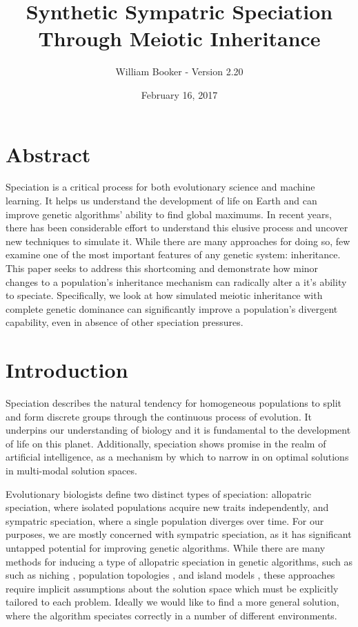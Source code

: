 \documentclass{article}
\title{Synthetic Sympatric Speciation Through Meiotic Inheritance}
\author{William Booker - Version 2.20}
\date{February 16, 2017}
\newcommand\TODO[1]{\textcolor{red}{#1}}
\begin{document}
\captionsetup{justification=centering}

\maketitle


\section{Abstract}

Speciation is a critical process for both evolutionary science and machine learning. It helps us understand the development of life on Earth and can improve genetic algorithms' ability to find global maximums. In recent years, there has been considerable effort to understand this elusive process and uncover new techniques to simulate it. While there are many approaches for doing so, few examine one of the most important features of any genetic system: inheritance. This paper seeks to address this shortcoming and demonstrate how minor changes to a population's inheritance mechanism can radically alter a it's ability to speciate. Specifically, we look at how simulated meiotic inheritance with complete genetic dominance can significantly improve a population's divergent capability, even in absence of other speciation pressures. 



\section{Introduction}

Speciation describes the natural tendency for homogeneous populations to split and form discrete groups through the continuous process of evolution. \cite{SPBOOK} It underpins our understanding of biology and it is fundamental to the development of life on this planet. Additionally, speciation shows promise in the realm of artificial intelligence, as a mechanism by which to narrow in on optimal solutions in multi-modal solution spaces.

Evolutionary biologists define two distinct types of speciation: allopatric speciation, where isolated populations acquire new traits independently, and sympatric speciation, where a single population diverges over time. For our purposes, we are mostly concerned with sympatric speciation, as it has significant untapped potential for improving genetic algorithms. While there are many methods for inducing a type of allopatric speciation in genetic algorithms, such as such as niching \cite{NICHING}, population topologies \cite{TOPOLOGIES}, and island models \cite{ISLAND}, these approaches require implicit assumptions about the solution space which must be explicitly tailored to each problem. Ideally we would like to find a more general solution, where the algorithm speciates correctly in a number of different environments. 
\end{document}
